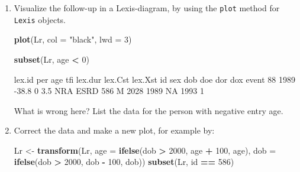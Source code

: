 \documentclass[
]{book}
\newenvironment{Shaded}{\begin{snugshade}}{\end{snugshade}}
\newcommand{\AttributeTok}[1]{\textcolor[rgb]{0.13,0.29,0.53}{#1}}
\newcommand{\DecValTok}[1]{\textcolor[rgb]{0.00,0.00,0.81}{#1}}
\newcommand{\FunctionTok}[1]{\textcolor[rgb]{0.13,0.29,0.53}{\textbf{#1}}}
\newcommand{\NormalTok}[1]{#1}
\newcommand{\OtherTok}[1]{\textcolor[rgb]{0.56,0.35,0.01}{#1}}
\newcommand{\SpecialCharTok}[1]{\textcolor[rgb]{0.81,0.36,0.00}{\textbf{#1}}}
\newcommand{\StringTok}[1]{\textcolor[rgb]{0.31,0.60,0.02}{#1}}
\begin{document}
\begin{enumerate}
\begin{Shaded}
\begin{Highlighting}[]
\FunctionTok{summary}\NormalTok{(Lr)}
\end{Highlighting}
\end{Shaded}

\begin{Shaded}
\begin{Highlighting}[]

\NormalTok{Transitions:}
\NormalTok{     To}
\NormalTok{From  NRA ESRD Records: Events: Risk time: Persons:}
\NormalTok{  NRA  48   77      125      77       1085      125}
\end{Highlighting}
\end{Shaded}

  Make sure you know what the variables in \texttt{Lr} stand for.
\item
  Visualize the follow-up in a Lexis-diagram, by using the
  \texttt{plot} method for \texttt{Lexis} objects.

\begin{Shaded}
\begin{Highlighting}[]
\FunctionTok{plot}\NormalTok{(Lr, }\AttributeTok{col =} \StringTok{"black"}\NormalTok{, }\AttributeTok{lwd =} \DecValTok{3}\NormalTok{)}
\end{Highlighting}
\end{Shaded}

\begin{Shaded}
\begin{Highlighting}[]
\FunctionTok{subset}\NormalTok{(Lr, age }\SpecialCharTok{\textless{}} \DecValTok{0}\NormalTok{)}
\end{Highlighting}
\end{Shaded}

\begin{Shaded}
\begin{Highlighting}[]
\NormalTok{ lex.id  per   age tfi lex.dur lex.Cst lex.Xst  id sex  dob  doe dor  dox event}
\NormalTok{     88 1989 {-}38.8   0     3.5     NRA    ESRD 586   M 2028 1989  NA 1993     1}
\end{Highlighting}
\end{Shaded}

  What is wrong here? List the data for the person with negative entry age.
\item
  Correct the data and make a new plot, for example by:

\begin{Shaded}
\begin{Highlighting}[]
\NormalTok{Lr }\OtherTok{\textless{}{-}} \FunctionTok{transform}\NormalTok{(Lr, }\AttributeTok{age =} \FunctionTok{ifelse}\NormalTok{(dob }\SpecialCharTok{\textgreater{}} \DecValTok{2000}\NormalTok{, age }\SpecialCharTok{+} \DecValTok{100}\NormalTok{, age),}
                    \AttributeTok{dob =} \FunctionTok{ifelse}\NormalTok{(dob }\SpecialCharTok{\textgreater{}} \DecValTok{2000}\NormalTok{, dob }\SpecialCharTok{{-}} \DecValTok{100}\NormalTok{, dob))}
\FunctionTok{subset}\NormalTok{(Lr, id }\SpecialCharTok{==} \DecValTok{586}\NormalTok{)}
\end{Highlighting}
\end{Shaded}


\end{enumerate}
\end{document}
